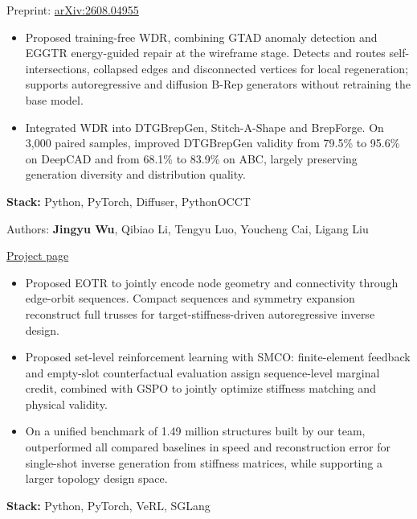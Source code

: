 \documentclass[11pt,a4paper]{article}
\begin{document}
Preprint: \href{https://arxiv.org/abs/2608.04955}{arXiv:2608.04955}
\begin{itemize}
\item Proposed training-free WDR, combining GTAD anomaly detection and EGGTR energy-guided repair at the wireframe stage. Detects and routes self-intersections, collapsed edges and disconnected vertices for local regeneration; supports autoregressive and diffusion B-Rep generators without retraining the base model.
\item Integrated WDR into DTGBrepGen, Stitch-A-Shape and BrepForge. On 3,000 paired samples, improved DTGBrepGen validity from 79.5\% to 95.6\% on DeepCAD and from 68.1\% to 83.9\% on ABC, largely preserving generation diversity and distribution quality.
\end{itemize}
\textbf{Stack:} Python, PyTorch, Diffuser, PythonOCCT

Authors: \textbf{Jingyu Wu}, Qibiao Li, Tengyu Luo, Youcheng Cai, Ligang Liu

\href{https://spaceboy202105.github.io/andyng2002.github.io/trussorbit/}{Project page}
\begin{itemize}
\item Proposed EOTR to jointly encode node geometry and connectivity through edge-orbit sequences. Compact sequences and symmetry expansion reconstruct full trusses for target-stiffness-driven autoregressive inverse design.
\item Proposed set-level reinforcement learning with SMCO: finite-element feedback and empty-slot counterfactual evaluation assign sequence-level marginal credit, combined with GSPO to jointly optimize stiffness matching and physical validity.
\item On a unified benchmark of 1.49 million structures built by our team, outperformed all compared baselines in speed and reconstruction error for single-shot inverse generation from stiffness matrices, while supporting a larger topology design space.
\end{itemize}
\textbf{Stack:} Python, PyTorch, VeRL, SGLang

\newpage
\end{document}
